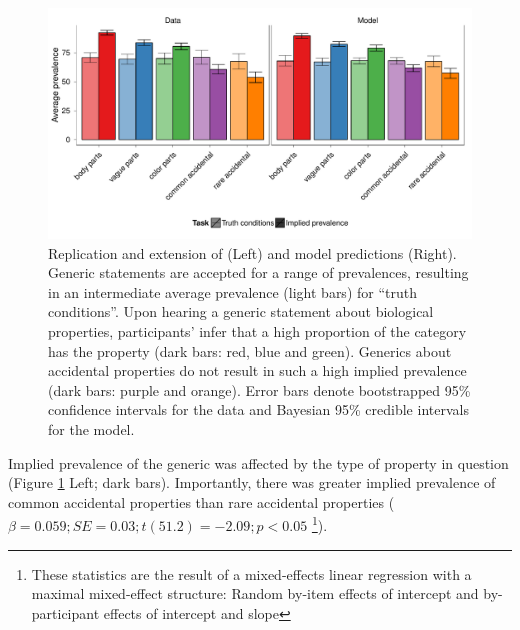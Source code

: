\documentclass[10pt,letterpaper]{article}
\begin{document}
\begin{figure}
\centering
    \includegraphics[width=\columnwidth]{asym-data-model-2opts-phi-100k.pdf}
    \caption{Replication and extension of \protect{} (Left) and model predictions (Right). 
    Generic statements are accepted for a range of prevalences, resulting in an intermediate average prevalence (light bars) for ``truth conditions''. 
    Upon hearing a generic statement about biological properties, participants' infer that a high proportion of the category has the property (dark bars: red, blue and green). 
    Generics about accidental properties do not result in such a high implied prevalence (dark bars: purple and orange).  Error bars denote bootstrapped 95\% confidence intervals for the data and Bayesian 95\% credible intervals for the model.}
  \label{fig:exp2b}
\end{figure}


%

Implied prevalence of the generic was affected by the type of property in question (Figure \ref{fig:exp2b} Left; dark bars). 
Importantly, there was greater implied prevalence of common accidental properties than rare accidental properties ($\beta=0.059; SE = 0.03; t(51.2) = -2.09; p < 0.05$ \footnote{These statistics are the result of a mixed-effects linear regression with a maximal mixed-effect structure: Random by-item effects of intercept and by-participant effects of intercept and slope}).
\end{document}
